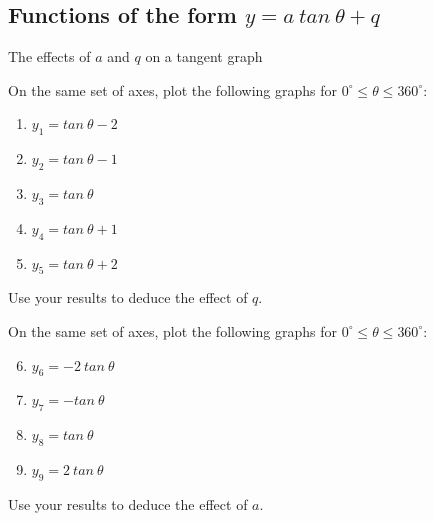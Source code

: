 \subsection*{Functions of the form $y=a~tan ~\theta+q$}
\begin{Investigation}{The effects of $a$ and $q$ on a tangent graph}
{On the same set of axes, plot the following graphs for $0^{\circ}\leq\theta\leq360^{\circ}$:
\begin{enumerate}[noitemsep, label=\textbf{\arabic*}. ] 
\item $y_1=tan ~\theta -2$
\item $y_2=tan ~\theta -1$
\item $y_3=tan ~\theta $
\item $y_4=tan ~\theta +1$
\item $y_5=tan ~\theta +2$
\end{enumerate}

Use your results to deduce the effect of $q$.\\
\par
On the same set of axes, plot the following graphs for
$0^{\circ} \leq \theta \leq 360^{\circ}$:
\begin{enumerate}[noitemsep, label=\textbf{\arabic*}. ] \setcounter{enumi}{5}
\item $y_6=-2~tan ~\theta $
\item $y_7=-tan ~\theta $
\item $y_8=tan ~\theta $
\item $y_9=2~tan ~\theta $
\end{enumerate}
Use your results to deduce the effect of $a$.
}
\end{Investigation}


